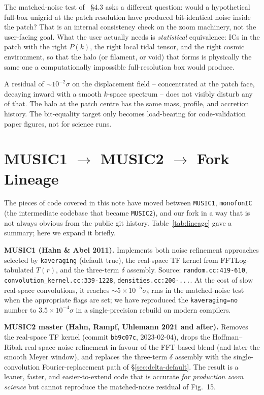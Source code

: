 \documentclass[12pt]{article}
\newcommand{\code}[1]{\texttt{#1}}
\begin{document}
The matched-noise test of \citet{Hahn2011}~\S4.3 asks a different
question: would a hypothetical full-box unigrid at the patch
resolution have produced bit-identical noise inside the patch?
That is an internal consistency check on the zoom machinery, not
the user-facing goal.  What the user actually needs is
\emph{statistical} equivalence: ICs in the patch with the right
$P(k)$, the right local tidal tensor, and the right cosmic
environment, so that the halo (or filament, or void) that forms is
physically the same one a computationally impossible full-resolution
box would produce.

A residual of $\sim 10^{-2}\sigma$ on the displacement field --
concentrated at the patch face, decaying inward with a smooth
$k$-space spectrum -- does not visibly disturb any of that.  The
halo at the patch centre has the same mass, profile, and accretion
history.  The bit-equality target only becomes load-bearing for
code-validation paper figures, not for science runs.

\section{MUSIC1 $\to$ MUSIC2 $\to$ Fork Lineage}
\label{sec:lineage}

The pieces of code covered in this note have moved between
\texttt{MUSIC1}, \texttt{monofonIC} (the intermediate codebase that
became \texttt{MUSIC2}), and our fork in a way that is not always
obvious from the public git history.  Table~\ref{tab:lineage}
gave a summary; here we expand it briefly.

\textbf{MUSIC1 (Hahn \& Abel 2011).}  Implements both noise
refinement approaches selected by \code{kaveraging} (default true),
the real-space TF kernel from FFTLog-tabulated $T(r)$, and the
three-term $\delta$ assembly.  Source: \code{random.cc:419-610},
\code{convolution\_kernel.cc:339-1228}, \code{densities.cc:200-...}.
At the cost of slow real-space convolutions, it reaches
$\sim 5\times 10^{-5}\sigma_\delta$ rms in the matched-noise test
when the appropriate flags are set; we have reproduced the
\code{kaveraging=no} number to $3.5 \times 10^{-4}\sigma$ in a
single-precision rebuild on modern compilers.

\textbf{MUSIC2 master (Hahn, Rampf, Uhlemann 2021 and after).}
Removes the real-space TF kernel (commit \texttt{bb9c07c},
2023-02-04), drops the Hoffman--Ribak real-space noise refinement
in favour of the FFT-based blend (and later the smooth Meyer
window), and replaces the three-term $\delta$ assembly with the
single-convolution Fourier-replacement path of \S\ref{sec:delta-default}.
The result is a leaner, faster, and easier-to-extend code that is
accurate \emph{for production zoom science} but cannot reproduce
the matched-noise residual of \citet{Hahn2011} Fig.~15.
\end{document}

